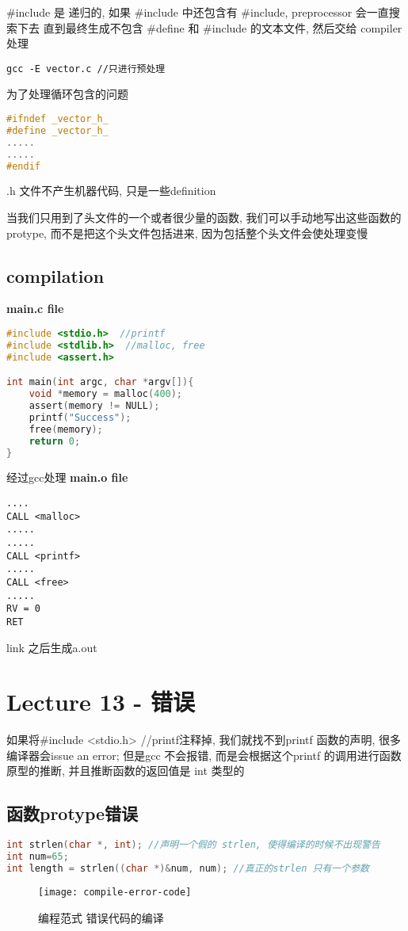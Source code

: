 \documentclass{article}
\begin{document}
\#include 是 递归的, 如果 \#include 中还包含有 \#include, preprocessor 会一直搜索下去
直到最终生成不包含 \#define 和 \#include 的文本文件, 然后交给 compiler 处理

\begin{verbatim}
gcc -E vector.c //只进行预处理
\end{verbatim}

为了处理循环包含的问题
\begin{lstlisting}[language = C]
#ifndef _vector_h_
#define _vector_h_
.....
.....
#endif
\end{lstlisting}
.h 文件不产生机器代码, 只是一些definition

当我们只用到了头文件的一个或者很少量的函数, 我们可以手动地写出这些函数的protype, 而不是把这个头文件包括进来, 因为包括整个头文件会使处理变慢

\subsection{compilation}
\textbf{main.c file}\\
\begin{lstlisting}[language = C]
#include <stdio.h>  //printf
#include <stdlib.h>  //malloc, free
#include <assert.h>

int main(int argc, char *argv[]){
	void *memory = malloc(400);
	assert(memory != NULL);
	printf("Success");
	free(memory);
	return 0;
}
\end{lstlisting}

经过gcc处理
\textbf{main.o file}
\begin{verbatim}
....
CALL <malloc>
.....
.....
CALL <printf>
.....
CALL <free>
.....
RV = 0
RET
\end{verbatim}
link 之后生成a.out

\section{Lecture 13 - 错误}
如果将\#include <stdio.h>  //printf注释掉, 我们就找不到printf 函数的声明, 很多编译器会issue an error; 但是gcc 不会报错, 而是会根据这个printf 的调用进行函数原型的推断, 并且推断函数的返回值是 int 类型的

\subsection{函数protype错误}
\begin{lstlisting}[language = C]
int strlen(char *, int); //声明一个假的 strlen, 使得编译的时候不出现警告
int num=65;
int length = strlen((char *)&num, num); //真正的strlen 只有一个参数
\end{lstlisting}
\begin{figure}[htbp]
	\centering
	\texttt{[image: compile-error-code]}\\
	\caption{编程范式 错误代码的编译}\label{fig.compile-error-code}
\end{figure}
\end{document}
